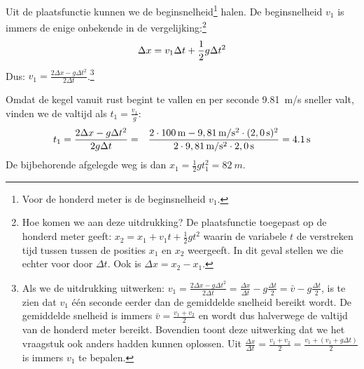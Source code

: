 \documentclass{ximera}
\begin{document}
\begin{exercise}
\begin{question}
\begin{oplossing}
            Uit de plaatsfunctie kunnen we de beginsnelheid\footnote{Voor de honderd meter is de beginsnelheid $v_1$.} halen. De beginsnelheid $v_1$ is immers de enige onbekende in de vergelijking:\footnote{Hoe komen we aan deze uitdrukking? De plaatsfunctie toegepast op de honderd meter geeft: $x_2=x_1+v_1t+\frac{1}{2}gt^2$ waarin de variabele $t$ de verstreken tijd tussen tussen de posities $x_1$ en $x_2$ weergeeft. In dit geval stellen we die echter voor door $\Delta t$. Ook is $\Delta x=x_2-x_1$.}
            \begin{equation*}
                \Delta x=v_1\Delta t+\frac{1}{2}g\Delta t^2\\
            \end{equation*}
            Dus: $v_1=\frac{2\Delta x-g\Delta t^2}{2\Delta t}$.\footnote{Als we de uitdrukking uitwerken: $v_1=\frac{2\Delta x-g\Delta t^2}{2\Delta t}=\frac{\Delta x}{\Delta t}-g\frac{\Delta t}{2}=\bar{v}-g\frac{\Delta t}{2}$, is te zien dat $v_1$ \'e\'en seconde eerder dan de gemiddelde snelheid bereikt wordt. De gemiddelde snelheid is immers $\bar{v}=\frac{v_1+v_2}{2}$ en wordt dus halverwege de valtijd van de honderd meter bereikt. Bovendien toont deze uitwerking dat we het vraagstuk ook anders hadden kunnen oplossen. Uit $\frac{\Delta x}{\Delta t}=\frac{v_1+v_2}{2}=\frac{v_1+(v_1+g\Delta t)}{2}$ is immers $v_1$ te bepalen.}
            
            Omdat de kegel vanuit rust begint te vallen en per seconde \SI{9,81}{m/s} sneller valt, vinden we de valtijd als $t_1=\frac{v_1}{g}$:
            \begin{eqnarray*}
                t_1=\frac{2\Delta x-g\Delta t^2}{2g\Delta t}&=&\frac{2\cdot100\rm\,m-9,81\rm\,m/s^2\cdot(2,0\rm\,s)^2}{2\cdot9,81\rm\,m/s^2\cdot2,0\rm\,s}=\SI{4,1}{s}
            \end{eqnarray*}
            De bijbehorende afgelegde weg is dan $x_1=\frac{1}{2}gt_1^2=\SI{82}{m}$.
        
        \end{oplossing}
    \end{question}

\end{exercise}
\end{document}

